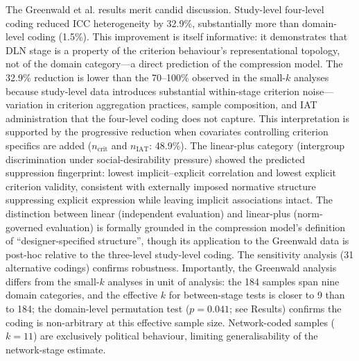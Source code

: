 \documentclass[11pt]{article}
\begin{document}
The Greenwald et al.\cite{Greenwald2009} results merit candid
discussion. Study-level four-level coding reduced ICC heterogeneity by
32.9\%, substantially more than domain-level coding (1.5\%). This
improvement is itself informative: it demonstrates that DLN stage is a
property of the criterion behaviour's representational topology, not of
the domain category---a direct prediction of the compression model.
The 32.9\% reduction is lower than the 70--100\% observed in the
small-$k$ analyses because study-level data introduces substantial
within-stage criterion noise---variation in criterion aggregation
practices, sample composition, and IAT administration that the
four-level coding does not capture. This interpretation is supported
by the progressive reduction when covariates controlling criterion
specifics are added ($n_\mathrm{crit}$ and $n_\mathrm{IAT}$: 48.9\%).
The linear-plus category (intergroup discrimination under
social-desirability pressure) showed the predicted suppression
fingerprint: lowest implicit--explicit correlation and lowest explicit
criterion validity, consistent with externally imposed normative
structure suppressing explicit expression while leaving implicit
associations intact. The distinction between linear (independent
evaluation) and linear-plus (norm-governed evaluation) is formally
grounded in the compression model's definition of ``designer-specified
structure''\cite{Wu2026}, though its application to the Greenwald data
is post-hoc relative to the three-level study-level coding. The
sensitivity analysis (31 alternative codings) confirms robustness.
Importantly, the Greenwald analysis differs from the small-$k$
analyses in unit of analysis: the 184 samples span nine domain
categories, and the effective $k$ for between-stage tests is closer
to 9 than to 184; the domain-level permutation test ($p = 0.041$;
see Results) confirms the coding is non-arbitrary at this effective
sample size. Network-coded samples ($k = 11$) are exclusively
political behaviour, limiting generalisability of the network-stage
estimate.
\end{document}
